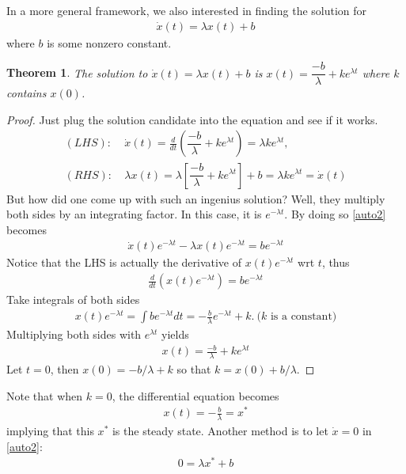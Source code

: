 \documentclass[11pt,a4paper]{book}
\newtheorem{theorem}{Theorem}[section]
\theoremstyle{definition}\newtheorem{definition}{Definition}
\theoremstyle{definition}\newtheorem{fact}{Fact}
\theoremstyle{definition}\newtheorem{remark}{Remark}
\theoremstyle{definition}\newtheorem{ex}{Ex.}
\theoremstyle{definition}\newtheorem{project}{Project}
\theoremstyle{definition}\newtheorem{problem}{Problem}
\theoremstyle{definition}\newtheorem{example}{Example}
\numberwithin{theorem}{section}
\numberwithin{corollary}{chapter}
\numberwithin{assumption}{chapter}
\numberwithin{definition}{chapter}
\numberwithin{prop}{chapter}
\numberwithin{notation}{chapter}
\numberwithin{problem}{chapter}
\numberwithin{example}{chapter}
\numberwithin{fact}{chapter}
\numberwithin{ex}{chapter}
\begin{document}
	In a more general framework, we also interested in finding the solution for
	\begin{align}
		\dot{x}(t) = \lambda x(t) + b \label{auto2}
	\end{align}
	where $b$ is some nonzero constant. 
	\begin{theorem}
		The solution to $\dot{x}(t) = \lambda x(t) + b$ is $x(t) = \dfrac{-b}{\lambda} + k e^{\lambda t}$ where $k$ contains $x(0)$. 
	\end{theorem}
	\begin{proof}
		Just plug the solution candidate into the equation and see if it works.
		\begin{align*}
			(LHS): & \ \dot{x}(t) = \frac{d}{dt} \left( \dfrac{-b}{\lambda} + k e^{\lambda t} \right) = \lambda k e^{\lambda t}, \\
			(RHS): & \ \lambda x(t) = \lambda \left[ \dfrac{-b}{\lambda} + k e^{\lambda t} \right] + b = \lambda k e^{\lambda t} = \dot{x}(t)
		\end{align*}
		But how did one come up with such an ingenius solution? Well, they multiply both sides by an integrating factor. In this case, it is $e^{-\lambda t}$. By doing so \eqref{auto2} becomes
		\begin{align*}
			\dot{x}(t) e^{-\lambda t} - \lambda x(t) e^{-\lambda t} = b e^{-\lambda t}
		\end{align*}
		Notice that the LHS is actually the derivative of $x(t) e^{-\lambda t}$ wrt $t$, thus
		\begin{align*}
			\frac{d}{dt} \left( x(t) e^{-\lambda t} \right) = b e^{-\lambda t}
		\end{align*}
		Take integrals of both sides
		\begin{align*}
			x(t) e^{-\lambda t} = \int b e^{-\lambda t} dt = -\frac{b}{\lambda} e^{-\lambda t} + k. \ \text{($k$ is a constant)}
		\end{align*}
		Multiplying both sides with $e^{\lambda t}$ yields
		\begin{align*}
			x(t) = \frac{-b}{\lambda} + k e^{\lambda t}
		\end{align*}
		Let $t=0$, then $x(0) = - b/\lambda + k$ so that $k = x(0) + b/\lambda$.
	\end{proof}
	Note that when $k=0$, the differential equation becomes
	\begin{align*}
		x(t) = -\frac{b}{\lambda} = x^*
	\end{align*}
	implying that this $x^*$ is the steady state. Another method is to let $\dot{x}=0$ in \eqref{auto2}:
	\begin{align*}
		0 = \lambda x^* + b
	\end{align*}
	
\end{document}

